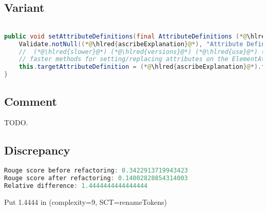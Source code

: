 \documentclass[11pt]{article}
\DeclareRobustCommand{\hlred}[1]{{\sethlcolor{YellowOrange}\hl{#1}}}
\begin{document}
\subsection{Variant}

\begin{lstlisting}[language=java]

public void setAttributeDefinitions(final AttributeDefinitions (*@\hlred{ascribeExplanation}@*)) {
    Validate.notNull((*@\hlred{ascribeExplanation}@*), "Attribute Definitions cannot be null");
    //  (*@\hlred{slower}@*) (*@\hlred{versions}@*) (*@\hlred{use}@*) (*@\hlred{these}@*) (*@\hlred{two}@*) (*@\hlred{versions}@*) (*@\hlred{as}@*) (*@\hlred{opposedto}@*) (*@\hlred{using}@*) (*@\hlred{this}@*) (*@\hlred{class}@*) (*@\hlred{which}@*) (*@\hlred{also}@*) (*@\hlred{defines}@*) (*@\hlred{more}@*)
    // faster methods for setting/replacing attributes on the ElementAttributes implementation
    this.targetAttributeDefinition = (*@\hlred{ascribeExplanation}@*).forName(TEMPLATE_MODE, TARGET_ATTR_NAME);
}
\end{lstlisting}

\subsection{Comment}

TODO.

\subsection{Discrepancy}

\begin{lstlisting}[language=java]
Rouge score before refactoring: 0.3422913719943423
Rouge score after refactoring: 0.14002828854314003
Relative difference: 1.4444444444444444
\end{lstlisting}

Put 1.4444 in (complexity=9, SCT=renameTokens)
\end{document}
